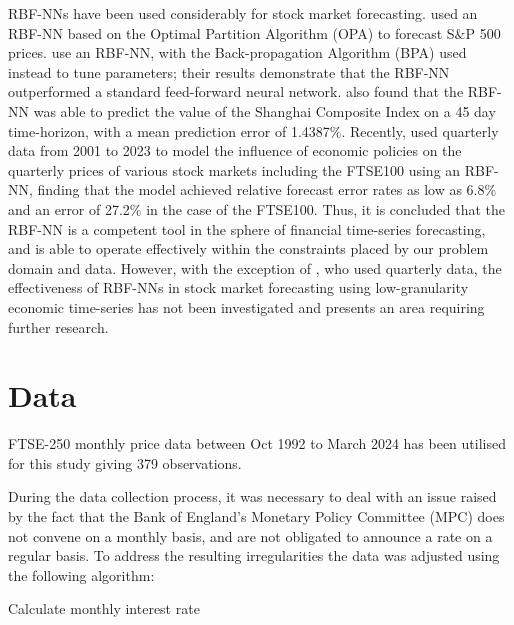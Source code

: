 \documentclass[11pt,a4paper]{article}
\newcommand{\citeboth}[1]{\citeauthor{#1} \citep{#1}}
\begin{document}
RBF-NNs have been used 
considerably for stock market forecasting. \citeboth{cao2004} 
used an RBF-NN based on the Optimal Partition Algorithm (OPA) to 
forecast S$\&$P 500 prices. \citeboth{dass2019} use an RBF-NN, with the Back-propagation 
Algorithm (BPA) used instead to tune parameters; their results demonstrate 
that the RBF-NN outperformed a standard feed-forward neural network. 
\citeboth{ji2014} also found that the RBF-NN was able to predict the value 
of the Shanghai Composite Index on a 45 day time-horizon, with a mean prediction error of 
1.4387$\%$. Recently, \citeboth{abotaleb2024}
used quarterly data from 2001 to 2023 to model the influence of economic 
policies on the quarterly prices of various stock markets including the 
FTSE100 using an RBF-NN, finding that the model 
achieved relative forecast error rates as low as 6.8$\%$ and an error of 
27.2$\%$ in the case of the FTSE100. Thus, it is concluded that the RBF-NN is a 
competent tool in the sphere of financial time-series forecasting, and 
is able to operate effectively within the constraints placed by our 
problem domain and data. However, with the exception of \citeboth{abotaleb2024}, who used 
quarterly data, the effectiveness of RBF-NNs in stock market forecasting using 
low-granularity economic time-series has not been investigated and presents an area requiring further 
research. 

\section{Data}

FTSE-250 monthly price data between Oct 1992 to March 2024 has been utilised for this study giving 379 observations.

During the data collection process, it was necessary to deal with an issue raised by the fact that the Bank of England’s Monetary Policy Committee (MPC) 
does not convene on a monthly basis, and are not obligated to 
announce a rate on a regular basis. To address the resulting irregularities the data was adjusted using the following algorithm:

\begin{algorithm}[H]
    \caption{Calculate monthly interest rate}
    \label{alg:interest_rate_adjustment}
    
\end{algorithm}
\end{document}
